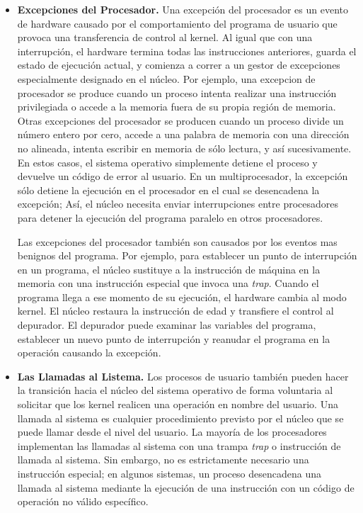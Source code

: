 \documentclass[10pt]{book}
\begin{document}
\begin{itemize}
\item \textbf{Excepciones del Procesador.} Una excepción del procesador es un evento de hardware causado por el comportamiento del programa de usuario que provoca una transferencia de control al kernel. Al igual que con una interrupción, el hardware termina todas las instrucciones anteriores, guarda el estado de ejecución actual, y comienza a correr a un gestor de excepciones especialmente designado en el núcleo. Por ejemplo, una excepcion de procesador se produce cuando un proceso intenta realizar una instrucción privilegiada o accede a la memoria fuera de su propia región de memoria. Otras excepciones del procesador se producen cuando un proceso divide un número entero  por cero, accede a una palabra de memoria con una dirección no alineada, intenta escribir en memoria de sólo lectura, y así sucesivamente. En estos casos, el sistema operativo simplemente detiene el proceso y devuelve un código de error al usuario. En un multiprocesador, la excepción sólo detiene la ejecución en el procesador en el cual se desencadena la excepción; Así, el núcleo necesita enviar interrupciones entre procesadores para detener la ejecución del programa paralelo en otros procesadores.

Las excepciones del procesador también son causados por los eventos mas benignos del programa. Por ejemplo, para establecer un punto de interrupción en un programa, el núcleo sustituye a la instrucción de máquina en la memoria con una instrucción especial que invoca una \textit{trap}. Cuando el programa llega a ese momento de su ejecución, el hardware cambia al modo kernel. El núcleo restaura la instrucción de edad y transfiere el control al depurador. El depurador puede examinar las variables del programa, establecer un nuevo punto de interrupción y reanudar el programa en la operación causando la excepción.

\item \textbf{Las Llamadas al Listema.} Los procesos de usuario también pueden hacer la transición hacia el núcleo del sistema operativo de forma voluntaria al solicitar que los kernel realicen una operación en nombre del usuario. Una llamada al sistema es cualquier procedimiento previsto por el núcleo que se puede llamar desde el nivel del usuario. La mayoría de los procesadores implementan las llamadas al sistema con una trampa \textit{trap} o instrucción de llamada al sistema. Sin embargo, no es estrictamente necesario una instrucción especial; en algunos sistemas, un proceso desencadena una llamada al sistema mediante la ejecución de una instrucción con un código de operación no válido específico.


\end{itemize}
\end{document}
